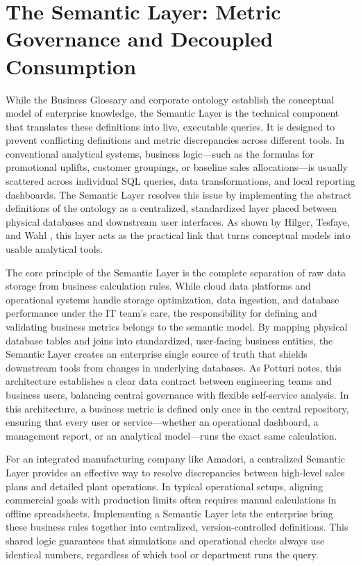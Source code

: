 \section[The Semantic Layer]{The Semantic Layer: Metric Governance and Decoupled Consumption}
\label{sec:semantic_layer}

While the Business Glossary and corporate ontology establish the conceptual model of enterprise knowledge, the Semantic Layer is the technical component that translates these 
definitions into live, executable queries. It is designed to prevent conflicting definitions and metric discrepancies across different tools. 
In conventional analytical systems, business logic---such as the formulas for promotional uplifts, customer groupings, or baseline sales allocations---is usually scattered 
across individual SQL queries, data transformations, and local reporting dashboards. The Semantic Layer resolves this issue by implementing the abstract definitions 
of the ontology as a centralized, standardized layer placed between physical databases and downstream user interfaces. 
As shown by Hilger, Tesfaye, and Wahl \cite{hilger2026bridging}, this layer acts as the practical link that turns conceptual models into usable analytical tools.

The core principle of the Semantic Layer is the complete separation of raw data storage from business calculation rules. While cloud data platforms and operational systems 
handle storage optimization, data ingestion, and database performance under the IT team's care, the responsibility for defining and validating business metrics 
belongs to the semantic model. By mapping physical database tables and joins into standardized, user-facing business entities, the Semantic Layer creates an enterprise 
single source of truth that shields downstream tools from changes in underlying databases. As Potturi \cite{potturi2025demystifying} notes, 
this architecture establishes a clear data contract between engineering teams and business users, balancing central governance with flexible self-service analysis. 
In this architecture, a business metric is defined only once in the central repository, ensuring that every user or service---whether an operational dashboard, 
a management report, or an analytical model---runs the exact same calculation.

For an integrated manufacturing company like Amadori, a centralized Semantic Layer provides an effective way to resolve discrepancies between high-level sales plans 
and detailed plant operations. In typical operational setups, aligning commercial goals with production limits often requires manual calculations in offline spreadsheets. 
Implementing a Semantic Layer lets the enterprise bring these business rules together into centralized, version-controlled definitions. This shared logic guarantees that 
simulations and operational checks always use identical numbers, regardless of which tool or department runs the query.

